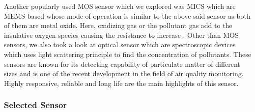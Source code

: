 Another popularly used  MOS sensor which we explored was MICS which are MEMS based whose mode of operation is similar to the above said sensor as both of them are metal oxide. Here, oxidizing gas or the pollutant gas add to the insulative oxygen species causing the resistance to increase \cite{SGXSensortech}.
 Other than MOS sensors, we also took a look at optical sensor which are spectroscopic devices which uses light scattering principle to find the concentration of pollutants. These sensors are known for its detecting capability of particulate matter of different sizes and is one of the recent development in the field of air quality monitoring. Highly responsive, reliable and long life are the main highlights of this sensor.
 \subsubsection{Selected Sensor}

